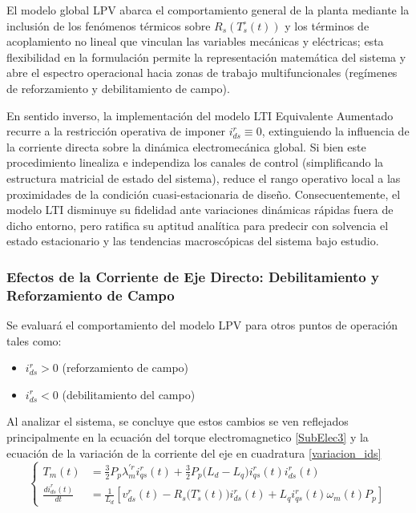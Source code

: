 \documentclass[blue,fullpaper]{ludusofficial}  %
\begin{document}
El modelo global LPV abarca el comportamiento general de la planta mediante la inclusión de los fenómenos térmicos sobre $R_s(T_s^\circ(t))$ y los términos de acoplamiento no lineal que vinculan las variables mecánicas y eléctricas; esta flexibilidad en la formulación permite la representación matemática del sistema y abre el espectro operacional hacia zonas de trabajo multifuncionales (regímenes de reforzamiento y debilitamiento de campo).  

En sentido inverso, la implementación del modelo LTI Equivalente Aumentado recurre a la restricción operativa de imponer $i^r_{ds} \equiv 0$, extinguiendo la influencia de la corriente directa sobre la dinámica electromecánica global. Si bien este procedimiento linealiza e independiza los canales de control (simplificando la estructura matricial de estado del sistema), reduce el rango operativo local a las proximidades de la condición cuasi-estacionaria de diseño. Consecuentemente, el modelo LTI disminuye su fidelidad ante variaciones dinámicas rápidas fuera de dicho entorno, pero ratifica su aptitud analítica para predecir con solvencia el estado estacionario y las tendencias macroscópicas del sistema bajo estudio. 

\subsubsection{Efectos de la Corriente de Eje Directo: Debilitamiento y Reforzamiento de Campo}
Se evaluará el comportamiento del modelo LPV para otros puntos de operación tales como: 

\begin{itemize}
    \item $i_{ds}^r>0$ (reforzamiento de campo)
    \item $i_{ds}^r<0$ (debilitamiento del campo)
\end{itemize}

Al analizar el sistema, se concluye que estos cambios se ven reflejados principalmente en la ecuación del torque electromagnetico \eqref{SubElec3} y la ecuación de la variación de la corriente del eje en cuadratura \eqref{variacion_ids}
\[
\left\{
\begin{aligned}
 T_{m}(t)  &  = \frac{3}{2}P_{p} \lambda_{m}^{'r} i_{qs}^{r}(t) + \frac{3}{2} P_{p} \Big( L_{d} - L_{q} \Big) i_{qs}^{r}(t) i_{ds}^{r}(t) \\
 \frac{di_{ds}^{r}(t)}{dt}  & = \frac{1}{L_{d}} \left[ v_{ds}^{r}(t) - R_{s} \Big( T_{s}^{\circ} (t) \Big) i_{ds}^{r}(t) + L_{q}i_{qs}^{r}(t) \omega_{m}(t)P_{p}  \right] 
\end{aligned}
\right.
\]
\end{document}

